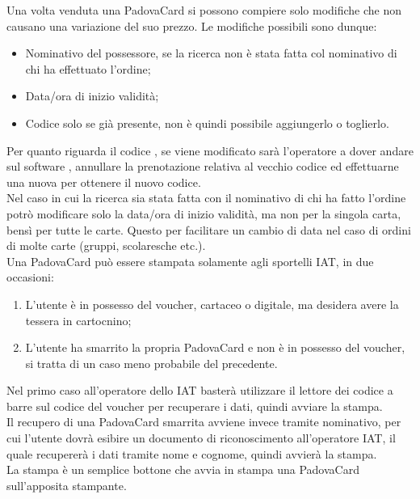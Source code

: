 Una volta venduta una PadovaCard si possono compiere solo modifiche che non causano una variazione del suo prezzo. Le modifiche possibili sono dunque:
\begin{itemize}
\item Nominativo del possessore, se la ricerca non è stata fatta col nominativo di chi ha effettuato l'ordine;
\item Data/ora di inizio validità;
\item Codice \tlite solo se già presente, non è quindi possibile aggiungerlo o toglierlo.
\end{itemize}
Per quanto riguarda il codice \tlite, se viene modificato sarà l'operatore a dover andare sul software \tlite, annullare la prenotazione relativa al vecchio codice ed effettuarne una nuova per ottenere il nuovo codice. \\

Nel caso in cui la ricerca sia stata fatta con il nominativo di chi ha fatto l'ordine potrò modificare solo la data/ora di inizio validità, ma non per la singola carta, bensì per tutte le carte. Questo per facilitare un cambio di data nel caso di ordini di molte carte (gruppi, scolaresche etc.). \\

Una PadovaCard può essere stampata solamente agli sportelli IAT, in due occasioni:
\begin{enumerate}
\item L'utente è in possesso del voucher, cartaceo o digitale, ma desidera avere la tessera in cartocnino;
\item L'utente ha smarrito la propria PadovaCard e non è in possesso del voucher, si tratta di un caso meno probabile del precedente.
\end{enumerate}
Nel primo caso all'operatore dello IAT basterà utilizzare il lettore dei codice a barre sul codice del voucher per recuperare i dati, quindi avviare la stampa. \\

Il recupero di una PadovaCard smarrita avviene invece tramite nominativo, per cui l'utente dovrà esibire un documento di riconoscimento all'operatore IAT, il quale recupererà i dati tramite nome e cognome, quindi avvierà la stampa. \\	

La stampa è un semplice bottone che avvia in stampa una PadovaCard sull'apposita stampante.

